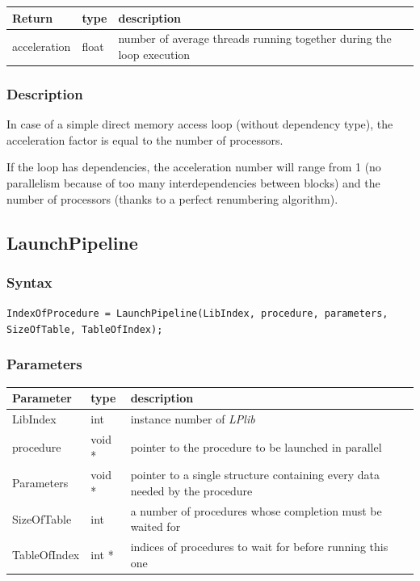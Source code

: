 \documentclass[a4paper,12pt]{article}
\begin{document}
\medskip

\noindent
\begin{tabular}{|m{2cm}|m{1.5cm}|m{10.5cm}|}
\hline
Return     & type   & description \\
\hline
acceleration & float & number of average threads running together during the loop execution \\
\hline
\end{tabular}

\subsubsection*{Description}
In case of a simple direct memory access loop (without dependency type), the acceleration factor is equal to the number of processors.

If the loop has dependencies, the acceleration number will range from 1 (no parallelism because of too many interdependencies between blocks) and the number of processors (thanks to a perfect renumbering algorithm).


\subsection{LaunchPipeline}

\subsubsection*{Syntax}
\tt{IndexOfProcedure = LaunchPipeline(LibIndex, procedure, parameters, SizeOfTable, TableOfIndex);}
\normalfont

\subsubsection*{Parameters}
\begin{tabular}{|m{3cm}|m{1.5cm}|m{10.5cm}|}
\hline
Parameter    & type   & description \\
\hline
LibIndex     & int    & instance number of \emph{LPlib} \\
\hline
procedure    & void * & pointer to the procedure to be launched in parallel \\
\hline
Parameters   & void * & pointer to a single structure containing every data needed by the procedure \\
\hline
SizeOfTable  & int    & a number of procedures whose completion must be waited for \\
\hline
TableOfIndex & int *  & indices of procedures to wait for before running this one \\
\hline
\end{tabular}
\end{document}
